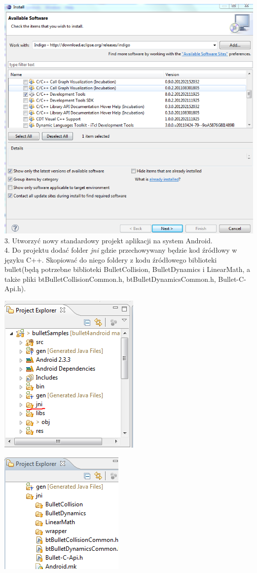   \includegraphics[width=\textwidth]{./img/CDT.png}
  3. Utworzyć nowy standardowy projekt aplikacji na system Android.\\
  4. Do projektu dodać folder \emph{jni} gdzie przechowywany będzie kod źródłowy
  w języku C++. Skopiować do niego foldery z kodu źródłowego biblioteki
  bullet(będą potrzebne biblioteki BulletCollision, BulletDynamics i
  LinearMath, a także pliki btBulletCollisionCommon.h,
  btBulletDynamicsCommon.h, Bullet-C-Api.h).
  
  \includegraphics{./img/jni-folder.png}
  
  \includegraphics{./img/bulletFoldery.png}
  
